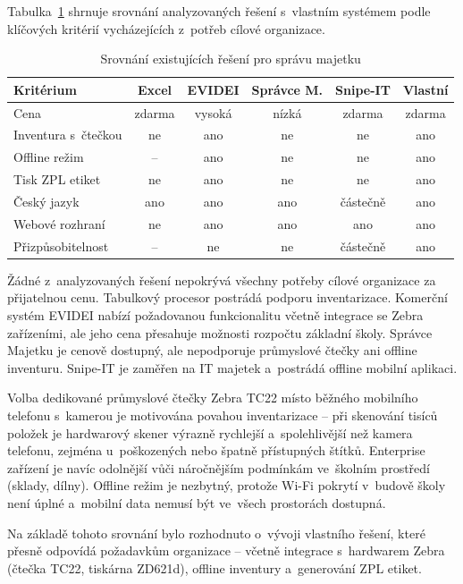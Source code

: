 Tabulka~\ref{tab:comparison} shrnuje srovnání analyzovaných řešení s~vlastním systémem podle klíčových kritérií vycházejících z~potřeb cílové organizace.

\begin{table}[H]\centering\footnotesize
\renewcommand{\arraystretch}{1.3}
\caption{Srovnání existujících řešení pro správu majetku}\label{tab:comparison}
\begin{tabular}{l|c|c|c|c|c}
	\textbf{Kritérium} & \textbf{Excel} & \textbf{EVIDEI} & \textbf{Správce M.} & \textbf{Snipe-IT} & \textbf{Vlastní} \tabularnewline \hline
	Cena & zdarma & vysoká & nízká & zdarma & zdarma \tabularnewline
	Inventura s~čtečkou & ne & ano & ne & ne & ano \tabularnewline
	Offline režim & -- & ano & ne & ne & ano \tabularnewline
	Tisk ZPL etiket & ne & ano & ne & ne & ano \tabularnewline
	Český jazyk & ano & ano & ano & částečně & ano \tabularnewline
	Webové rozhraní & ne & ano & ano & ano & ano \tabularnewline
	Přizpůsobitelnost & -- & ne & ne & částečně & ano \tabularnewline
\end{tabular}
\end{table}

Žádné z~analyzovaných řešení nepokrývá všechny potřeby cílové organizace za přijatelnou cenu. Tabulkový procesor postrádá podporu inventarizace. Komerční systém EVIDEI nabízí požadovanou funkcionalitu včetně integrace se Zebra zařízeními, ale jeho cena přesahuje možnosti rozpočtu základní školy. Správce Majetku je cenově dostupný, ale nepodporuje průmyslové čtečky ani offline inventuru. Snipe-IT je zaměřen na IT majetek a~postrádá offline mobilní aplikaci.

Volba dedikované průmyslové čtečky Zebra TC22 místo běžného mobilního telefonu s~kamerou je motivována povahou inventarizace -- při skenování tisíců položek je hardwarový skener výrazně rychlejší a~spolehlivější než kamera telefonu, zejména u~poškozených nebo špatně přístupných štítků. Enterprise zařízení je navíc odolnější vůči náročnějším podmínkám ve~školním prostředí (sklady, dílny). Offline režim je nezbytný, protože Wi-Fi pokrytí v~budově školy není úplné a~mobilní data nemusí být ve~všech prostorách dostupná.

Na základě tohoto srovnání bylo rozhodnuto o~vývoji vlastního řešení, které přesně odpovídá požadavkům organizace -- včetně integrace s~hardwarem Zebra (čtečka TC22, tiskárna ZD621d), offline inventury a~generování ZPL etiket.


